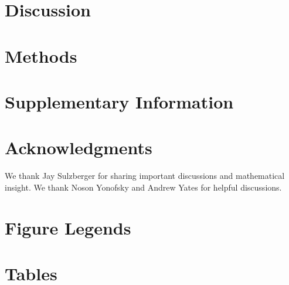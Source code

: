 \section{Discussion}


\section{Methods}


\section{Supplementary Information}

%
%

\section{Acknowledgments}
We thank Jay Sulzberger for sharing important discussions and mathematical insight. We thank Noson Yonofsky and Andrew Yates for helpful discussions.


\pagebreak
\section{Figure Legends}


\FloatBarrier

\section{Tables}



%



